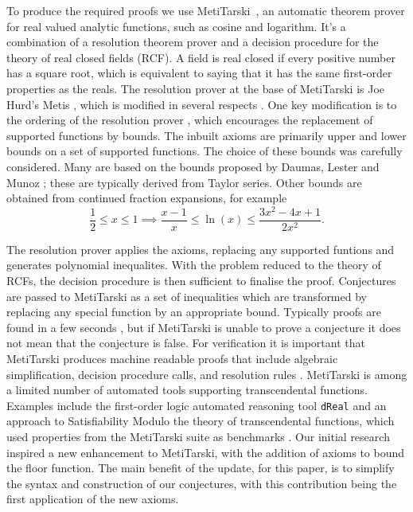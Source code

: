 \documentclass{fac}
\begin{document}
To produce the required proofs we use MetiTarski~\cite{akbarpour2010metitarski}, an automatic theorem prover for real valued analytic functions, such as cosine and logarithm. It's a combination of a resolution theorem prover and a decision procedure for the theory of real closed fields (RCF). A field is real closed if every positive number has a square root, which is equivalent to saying that it has the same first-order properties as the reals. The resolution prover at the base of MetiTarski is Joe Hurd's Metis \cite{metis_theorem_prover}, which is modified in several respects \cite{akbarpour2008metitarski}. One key modification is to the ordering of the resolution prover \cite{ludwig2007extension}, which encourages the replacement of supported functions by bounds. The inbuilt axioms are primarily upper and lower bounds on a set of supported functions. The choice of these bounds was carefully considered. Many are based on the bounds proposed by Daumas, Lester and Munoz \cite{daumas2008verified}; these are typically derived from Taylor series. Other bounds are obtained from continued fraction expansions, for example
\[\frac{1}{2} \leq x \leq 1 \implies \frac{x-1}{x} \leq \ln(x) \leq \frac{3x^2-4x+1}{2x^2}.\]

The resolution prover applies the axioms, replacing any supported funtions and generates polynomial inequalites. With the problem reduced to the theory of RCFs, the decision procedure is then sufficient to finalise the proof. Conjectures are passed to MetiTarski as a set of inequalities which are transformed by replacing any special function by an appropriate bound. Typically proofs are found in a few seconds \cite{akbarpour2009applications}, but if MetiTarski is unable to prove a conjecture it does not mean that the conjecture is false. For verification it is important that MetiTarski produces machine readable proofs that include algebraic simplification, decision procedure calls, and resolution rules \cite{denman2009formal}. MetiTarski is among a limited number of automated tools supporting transcendental functions. Examples include the first-order logic automated reasoning tool \texttt{dReal} \cite{gao2013dreal} and an approach to Satisfiability Modulo the theory of transcendental functions, which used properties from the MetiTarski suite as benchmarks \cite{cimatti2017satisfiability}. Our initial research inspired a new enhancement to MetiTarski, with the addition of axioms to bound the floor function. The main benefit of the update, for this paper, is to simplify the syntax and construction of our conjectures, with this contribution being the first application of the new axioms.
\end{document}

